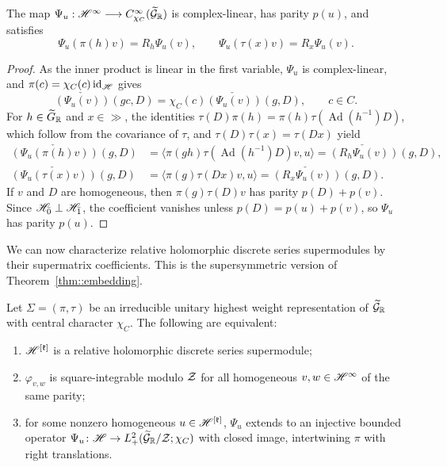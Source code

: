 \begin{lemma}
The map
$
\Psi_u:{\mathscr{H}}^\infty
\longrightarrow C^\infty_{\chi_C}(\widetilde{{\mathcal{G}}}_{{\mathbb R}})
$
is complex-linear, has parity $p(u)$, and satisfies
\[
\Psi_u(\pi(h)v)=R_h\Psi_u(v),
\qquad
\Psi_u(\tau(x)v)=R_x\Psi_u(v).
\]
\end{lemma}

\begin{proof}
As the inner product is linear in the first variable, $\Psi_u$ is complex-linear, and $\pi(c)=\chi_C(c)\operatorname{id}_{{\mathscr{H}}}$ gives
\[
\check{(\Psi_u(v))}(gc,D)=\chi_C(c)\check{(\Psi_u(v))}(g,D),
\qquad c\in C.
\]
For $h\in\widetilde{G}_{{\mathbb R}}$ and $x\in\gg$, the identities $\tau(D)\pi(h)=\pi(h)\tau(\operatorname{Ad}(h^{-1})D)$, which follow from the covariance of $\tau$, and $\tau(D)\tau(x)=\tau(Dx)$ yield
\[
\begin{aligned}
\check{(\Psi_u(\pi(h)v))}(g,D)
&=\langle\pi(gh)\tau(\operatorname{Ad}(h^{-1})D)v,u\rangle
=\check{(R_h\Psi_u(v))}(g,D),\\
\check{(\Psi_u(\tau(x)v))}(g,D)
&=\langle\pi(g)\tau(Dx)v,u\rangle
=\check{(R_x\Psi_u(v))}(g,D).
\end{aligned}
\]
If $v$ and $D$ are homogeneous, then $\pi(g)\tau(D)v$ has parity $p(D)+p(v)$. Since ${\mathscr{H}}_{\bar0}\perp{\mathscr{H}}_{\bar1}$, the coefficient vanishes unless $p(D)=p(u)+p(v)$, so $\Psi_u$ has parity $p(u)$.
\end{proof}

We can now characterize relative holomorphic discrete series supermodules by their supermatrix coefficients. This is the supersymmetric version of Theorem~\ref{thm::embedding}.


\begin{theorem}\label{thm::super_embedding}
Let $\Sigma=(\pi,\tau)$ be an irreducible unitary highest weight representation of $\widetilde{{\mathcal{G}}}_{{\mathbb R}}$ with central character $\chi_C$. The following are equivalent:
\begin{enumerate}
\item[(a)] ${\mathscr{H}}^{[{\mathfrak k}]}$ is a relative holomorphic discrete series supermodule;
\item[(b)] $\varphi_{v,w}$ is square-integrable modulo ${\mathcal{Z}}$ for all homogeneous $v,w\in{\mathscr{H}}^\infty$ of the same parity;
\item[(c)] for some nonzero homogeneous $u\in{\mathscr{H}}^{[{\mathfrak k}]}$, $\Psi_u$ extends to an injective bounded operator $\Psi_u\colon{\mathscr{H}}\to L^2_+(\widetilde{{\mathcal{G}}}_{{\mathbb R}}/{\mathcal{Z}};\chi_C)$ with closed image, intertwining $\pi$ with right translations.
\end{enumerate}
\end{theorem}

